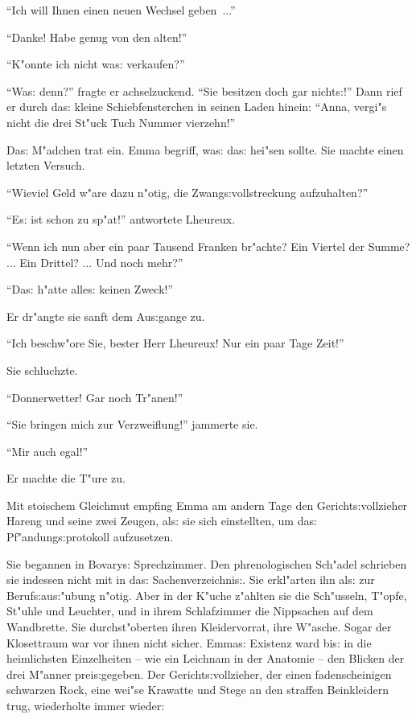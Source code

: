 \documentclass[oneside,12pt]{book}
\newcommand{\s}{s:}%
\begin{document}
"`Ich will Ihnen einen neuen Wechsel geben~..."'

"`Danke! Habe genug von den alten!"'

"`K"onnte ich nicht wa{\s} verkaufen?"'

"`Wa{\s} denn?"' fragte er achselzuckend. "`Sie besitzen doch gar
nicht{\s}!"' Dann rief er durch da{\s} kleine Schiebfensterchen in
seinen Laden hinein: "`Anna, vergi"s nicht die drei St"uck Tuch
Nummer vierzehn!"'

Da{\s} M"adchen trat ein. Emma begriff, wa{\s} da{\s} hei"sen
sollte. Sie machte einen letzten Versuch.

"`Wieviel Geld w"are dazu n"otig, die Zwang{\s}vollstreckung
aufzuhalten?"'

"`E{\s} ist schon zu sp"at!"' antwortete Lheureux.

"`Wenn ich nun aber ein paar Tausend Franken br"achte? Ein Viertel
der Summe? ... Ein Drittel? ... Und noch mehr?"'

"`Da{\s} h"atte alle{\s} keinen Zweck!"'

Er dr"angte sie sanft dem Au{\s}gange zu.

"`Ich beschw"ore Sie, bester Herr Lheureux! Nur ein paar Tage
Zeit!"'

Sie schluchzte.

"`Donnerwetter! Gar noch Tr"anen!"'

"`Sie bringen mich zur Verzweiflung!"' jammerte sie.

"`Mir auch egal!"'

Er machte die T"ure zu.


\newpage\begin{center}
{\large \so{Siebente{\s} Kapitel}}\bigskip\bigskip
\end{center}

Mit stoischem Gleichmut empfing Emma am andern Tage den
Gericht{\s}vollzieher Hareng und seine zwei Zeugen, al{\s} sie
sich einstellten, um da{\s} Pf"andung{\s}protokoll aufzusetzen.

Sie begannen in Bovary{\s} Sprechzimmer. Den phrenologischen
Sch"adel schrieben sie indessen nicht mit in da{\s}
Sachenverzeichni{\s}. Sie erkl"arten ihn al{\s} zur
Beruf{\s}au{\s}"ubung n"otig. Aber in der K"uche z"ahlten sie die
Sch"usseln, T"opfe, St"uhle und Leuchter, und in ihrem
Schlafzimmer die Nippsachen auf dem Wandbrette. Sie
durchst"oberten ihren Kleidervorrat, ihre W"asche. Sogar der
Klosettraum war vor ihnen nicht sicher. Emma{\s} Existenz ward
bi{\s} in die heimlichsten Einzelheiten -- wie ein Leichnam in der
Anatomie -- den Blicken der drei M"anner prei{\s}gegeben. Der
Gericht{\s}vollzieher, der einen fadenscheinigen schwarzen Rock,
eine wei"se Krawatte und Stege an den straffen Beinkleidern trug,
wiederholte immer wieder:
\end{document}
